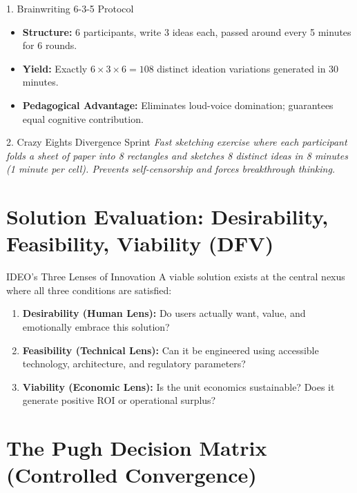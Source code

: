 \begin{frameworkbox}{1. Brainwriting 6-3-5 Protocol}
\begin{itemize}
    \item \textbf{Structure:} 6 participants, write 3 ideas each, passed around every 5 minutes for 6 rounds.
    \item \textbf{Yield:} Exactly $6 \times 3 \times 6 = 108$ distinct ideation variations generated in 30 minutes.
    \item \textbf{Pedagogical Advantage:} Eliminates loud-voice domination; guarantees equal cognitive contribution.
\end{itemize}
\end{frameworkbox}

\begin{frameworkbox}{2. Crazy Eights Divergence Sprint}
\textit{Fast sketching exercise where each participant folds a sheet of paper into 8 rectangles and sketches 8 distinct ideas in 8 minutes (1 minute per cell). Prevents self-censorship and forces breakthrough thinking.}
\end{frameworkbox}

\section{Solution Evaluation: Desirability, Feasibility, Viability (DFV)}

\begin{metricbox}{IDEO's Three Lenses of Innovation}
A viable solution exists at the central nexus where all three conditions are satisfied:
\begin{enumerate}[label=\textbf{\arabic*.}, leftmargin=2em]
    \item \textbf{Desirability (Human Lens):} Do users actually want, value, and emotionally embrace this solution?
    \item \textbf{Feasibility (Technical Lens):} Can it be engineered using accessible technology, architecture, and regulatory parameters?
    \item \textbf{Viability (Economic Lens):} Is the unit economics sustainable? Does it generate positive ROI or operational surplus?
\end{enumerate}
\end{metricbox}

\section{The Pugh Decision Matrix (Controlled Convergence)}

